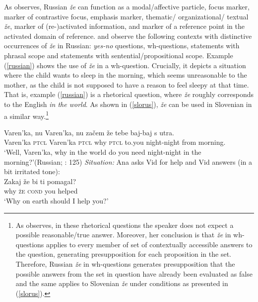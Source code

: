 \documentclass[output=paper,
modfonts,
newtxmath,
hidelinks
]{langscibook}
\begin{document}
\noindent As \cite{mccoy2003} observes, Russian \textit{že} can function as a modal/affective particle, focus marker, marker of contrastive focus, emphasis marker, thematic/ organizational/ textual \textit{že}, marker of (re-)activated information, and marker of a reference point in the activated domain of reference. \citet{hagstrommccoy2003} and \cite{mccoy2003} observe the following contexts with distinctive occurrences of \textit{že} in Russian: \textit{yes-no} questions, wh-questions, statements with phrasal scope and statements with sentential/propositional scope. Example (\ref{russian}) shows the use of \textit{že} in a wh-question. Crucially, it depicts a situation where the child wants to sleep in the morning, which seems unreasonable to the mother, as the child is not supposed to have a reason to feel sleepy at that time. That is, example (\ref{russian}) is a rhetorical question, where \textit{že} roughly corresponds to the English \textit{in the world}. As shown in (\ref{slorus}), \textit{že} can be used in Slovenian in a similar way.\footnote{As \cite{mccoy2003} observes, in these rhetorical questions the speaker does not expect a possible reasonable/true answer. Moreover, her conclusion is that \textit{že} in wh-questions applies to every member of set of contextually accessible answers to the question, generating presupposition for each proposition in the set. Therefore, Russian \textit{že} in wh-questions generates presupposition that the possible answers from the set in question have already been evaluated as false and the same applies to Slovenian \textit{že} under conditions as presented in (\ref{slorus}).}

\begin{exe}
\ex\gll Varen'ka, nu Varen'ka, nu začem že tebe baj-baj s utra. \\
Varen'ka \textsc{ptcl} Varen'ka \textsc{ptcl} why \textsc{ptcl} to.you night-night from morning.\\
\glt `Well, Varen'ka, why in the world do you need night-night in the morning?'\hfill(Russian; \citealt{mccoy2003}: 125) \label{russian}
\ex \textit{Situation:} Ana asks Vid for help and Vid answers (in a bit irritated tone): \label{slorus} \\
\gll Zakaj že bi ti pomagal? \\
	why \textsc{že}  \textsc{cond} you helped \\
\trans `Why on earth should I help you?'
\end{exe}
\end{document}
